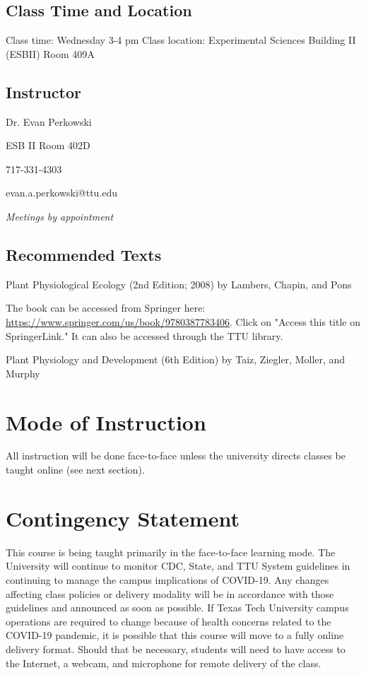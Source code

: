\documentclass[12pt, notitlepage]{article}   	%
\begin{document}
{\subsection{Class Time and Location}
Class time: Wednesday 3-4 pm
Class location: Experimental Sciences Building II (ESBII) Room 409A


\subsection{Instructor}
Dr. Evan Perkowski \par
ESB II Room 402D \par
717-331-4303 \par
evan.a.perkowski@ttu.edu \par 
\textit{Meetings by appointment}

\subsection{Recommended Texts}
Plant Physiological Ecology (2nd Edition; 2008) by Lambers, Chapin, and Pons \par
The book can be accessed from Springer here: 
\url{https://www.springer.com/us/book/9780387783406}. Click on "Access this title on 
SpringerLink." It can also be accessed through the TTU library. \par
Plant Physiology and Development (6th Edition) by Taiz, Ziegler, Moller, and Murphy

\section{Mode of Instruction}
All instruction will be done face-to-face unless the university directs classes be 
taught online (see next section).

\section{Contingency Statement}
This course is being taught primarily in the face-to-face learning mode. The University will continue to monitor CDC, State, and TTU System guidelines in continuing to manage the campus implications of COVID-19. Any changes affecting class policies or delivery modality will be in accordance with those guidelines and announced as soon as possible. If Texas Tech University campus operations are required to change because of health concerns related to the COVID-19 pandemic, it is possible that this course will move to a fully online delivery format. Should that be necessary, students will need to have access to the Internet, a webcam, and microphone for remote delivery of the class. 

}
\end{document}
